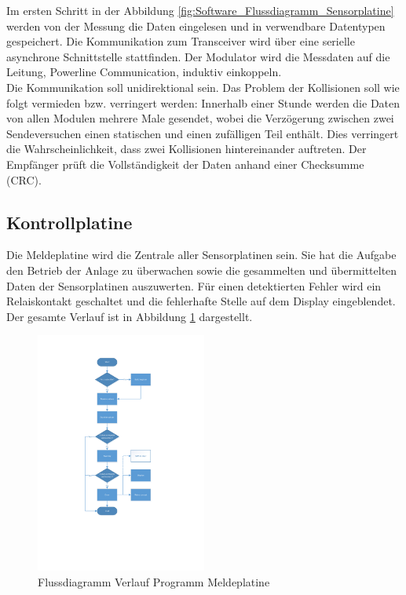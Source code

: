 Im ersten Schritt in der Abbildung \ref{fig:Software_Flussdiagramm_Sensorplatine} werden von der Messung die Daten eingelesen und in verwendbare Datentypen gespeichert. Die Kommunikation zum Transceiver wird über eine serielle asynchrone Schnittstelle stattfinden. Der Modulator wird die Messdaten auf die Leitung, Powerline Communication, induktiv einkoppeln. \\ Die Kommunikation soll unidirektional sein. Das Problem der Kollisionen soll wie folgt vermieden bzw. verringert werden: Innerhalb einer Stunde werden die Daten von allen Modulen mehrere Male gesendet, wobei die Verzögerung zwischen zwei Sendeversuchen einen statischen und einen zufälligen Teil enthält. Dies verringert die Wahrscheinlichkeit, dass zwei Kollisionen hintereinander auftreten.
Der Empfänger prüft die Vollständigkeit der Daten anhand einer Checksumme (CRC).

\subsection{Kontrollplatine}
Die Meldeplatine wird die Zentrale aller Sensorplatinen sein. Sie hat die Aufgabe den Betrieb der Anlage zu überwachen sowie die gesammelten und übermittelten Daten der Sensorplatinen auszuwerten. Für einen detektierten Fehler wird ein Relaiskontakt geschaltet und die fehlerhafte Stelle auf dem Display eingeblendet. Der gesamte Verlauf ist in Abbildung \ref{fig:Scheme_report_board} dargestellt.

\begin{figure}[h!] 
  \centering
     \includegraphics[width=0.5\textwidth]{graphics/Scheme_report_board}
  \caption{Flussdiagramm Verlauf Programm Meldeplatine}
  \label{fig:Scheme_report_board}
\end{figure}

